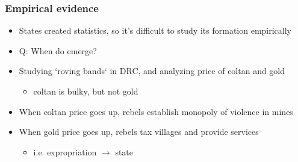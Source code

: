 \documentclass[aspectratio=43]{beamer}
\begin{document}
\begin{frame}
\frametitle{Empirical evidence}
\centering

\begin{minipage}{0.65\textwidth}\centering
  \begin{itemize}
    \item States created statistics, so it's difficult to study its formation empirically
    \item Q: When do  emerge?
    \item<2-> Studying `roving bands` in DRC, and analyzing price of coltan and gold
    \begin{itemize}
      \item coltan is bulky, but not gold
    \end{itemize}
    \item<3-> When coltan price goes up, rebels establish monopoly of violence in mines
    \item<3-> When gold price goes up, rebels tax villages and provide services
    \begin{itemize}
      \item i.e. expropriation $\rightarrow$ state
    \end{itemize}
  \end{itemize}
\end{minipage}\hfill
\begin{minipage}{0.34\textwidth}\centering

\end{minipage}
\end{frame}
\end{document}
